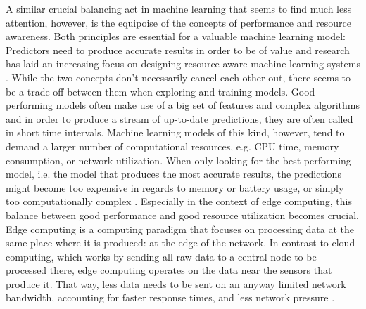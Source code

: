 A similar crucial balancing act in machine learning that seems to find much less attention, however, is the equipoise of the concepts of performance and resource awareness. Both principles are essential for a valuable machine learning model: Predictors need to produce accurate results in order to be of value and research has laid an increasing focus on designing resource-aware machine learning systems \cite{rapp2022}. While the two concepts don’t necessarily cancel each other out, there seems to be a trade-off between them when exploring and training models. Good-performing models often make use of a big set of features and complex algorithms and in order to produce a stream of up-to-date predictions, they are often called in short time intervals. Machine learning models of this kind, however, tend to demand a larger number of computational resources, e.g. CPU time, memory consumption, or network utilization. When only looking for the best performing model, i.e. the model that produces the most accurate results, the predictions might become too expensive in regards to memory or battery usage, or simply too computationally complex \cite{preuveneers2020}. Especially in the context of edge computing, this balance between good performance and good resource utilization becomes crucial. Edge computing is a computing paradigm that focuses on processing data at the same place where it is produced: at the edge of the network. In contrast to cloud computing, which works by sending all raw data to a central node to be processed there, edge computing operates on the data near the sensors that produce it. That way, less data needs to be sent on an anyway limited network bandwidth, accounting for faster response times, and less network pressure \cite{shi2016}.

